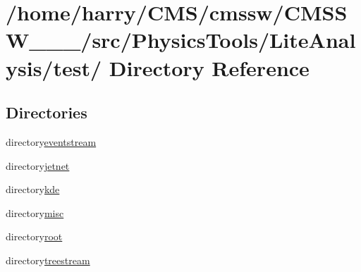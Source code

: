 \hypertarget{dir_000001}{
\section{/home/harry/CMS/cmssw/CMSSW\_\_\_/src/Physics\-Tools/Lite\-Analysis/test/ Directory Reference}
\label{dir_000001}
}


\subsection*{Directories}
\begin{CompactItemize}
\item 
directory\hyperlink{dir_000002}{eventstream}
\item 
directory\hyperlink{dir_000003}{jetnet}
\item 
directory\hyperlink{dir_000004}{kde}
\item 
directory\hyperlink{dir_000005}{misc}
\item 
directory\hyperlink{dir_000006}{root}
\item 
directory\hyperlink{dir_000007}{treestream}
\end{CompactItemize}
